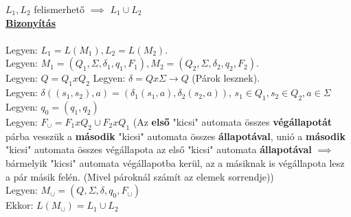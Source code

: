 \begin{frame}
\begin{tcolorbox}[title={Tétel: Felismerhető nyelvek egyesítése}]
$L_1, L_2$ felismerhető $\implies$ $L_1 \cup L_2$\\
\tcblower
\msmallskip
\underline{\textbf{Bizonyítás}}\\
\mmedskip
\\
Legyen: $L_1 = L(M_1), L_2 = L(M_2)$.\\
Legyen: $M_1 = (Q_1, \Sigma , {\delta}_1, q_1, F_1), M_2 = (Q_2, \Sigma , {\delta}_2, q_2, F_2)$.\\
Legyen: $Q = Q_1 x Q_2$
Legyen: $\delta = Q x \Sigma \rightarrow Q$ (Párok lesznek).\\
Legyen: $\delta((s_1, s_2), a) = ({\delta}_1(s_1, a), {\delta}_2(s_2, a))$, $s_1 \in Q_1, s_2 \in Q_2, a \in \Sigma$\\
\mbigskip
Legyen: $q_0 = (q_1, q_2)$\\
Legyen: \underline{\textbf{$F_{\cup} = F_1 x Q_2 \cup F_2 x Q_1$}} (Az \textbf{első} "kicsi" automata összes \textbf{végállapotát} párba vesszük a \textbf{második} "kicsi" automata összes \textbf{állapotával}, unió a \textbf{második} "kicsi" automata összes végállapota az első "kicsi" automata \textbf{állapotával} $\implies$ bármelyik "kicsi" automata végállapotba kerül, az a másiknak is végállapota lesz a pár másik felén. (Mivel pároknál számít az elemek sorrendje))\\
\msmallskip
Legyen: $M_{\cup} = (Q, \Sigma , \delta , q_0, F_{\cup})$\\
\mbigskip
Ekkor: \underline{$L(M_{\cup}) = L_1 \cup L_2$}\\
\end{tcolorbox}

\end{frame}

